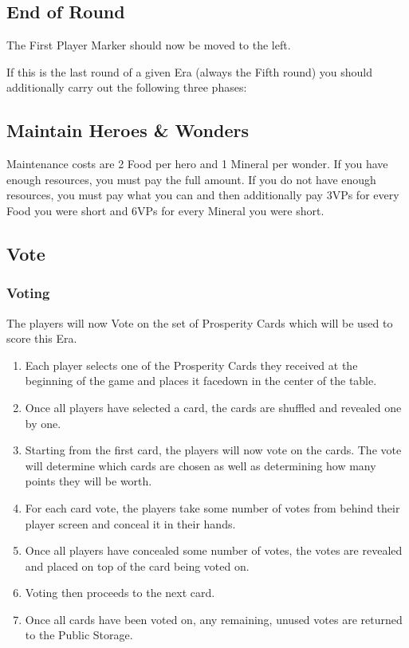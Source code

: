 \documentclass[10pt,twocolumn]{article}
\begin{document}
\subsection{End of Round}
The First Player Marker should now be moved to the left.

If this is the last round of a given Era (always the Fifth round) you should additionally carry out the following three phases:

\subsection{Maintain Heroes \& Wonders}
Maintenance costs are 2 Food per hero and 1 Mineral per wonder. If you have enough resources, you must pay the full amount. If you do not have enough resources, you must pay what you can and then additionally pay 3VPs for every Food you were short and 6VPs for every Mineral you were short.
\subsection{Vote}
\subsubsection{Voting}
The players will now Vote on the set of Prosperity Cards which will be used to score this Era.
\begin{enumerate}
\item Each player selects one of the Prosperity Cards they received at the beginning of the game and places it facedown in the center of the table.
\item Once all players have selected a card, the cards are shuffled and revealed one by one.
\item Starting from the first card, the players will now vote on the cards. The vote will determine which cards are chosen as well as determining how many points they will be worth.
\item For each card vote, the players take some number of votes from behind their player screen and conceal it in their hands. 
\item Once all players have concealed some number of votes, the votes are revealed and placed on top of the card being voted on.
\item Voting then proceeds to the next card.
\item Once all cards have been voted on, any remaining, unused votes are returned to the Public Storage.
\end{enumerate}
\end{document}
